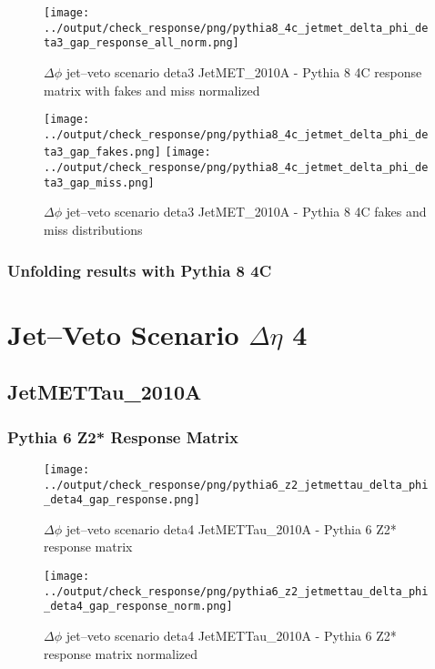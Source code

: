 \documentclass[11pt]{book}
\begin{document}
\begin{figure}[ht]
\centering
\texttt{[image: ../output/check\_response/png/pythia8\_4c\_jetmet\_delta\_phi\_deta3\_gap\_response\_all\_norm.png]}
\caption{$\Delta\phi$ jet--veto scenario deta3 JetMET\_2010A - Pythia 8 4C response matrix with fakes and miss normalized}
\label{p8_jetmet_delta_phi_deta3_gap_response_all_norm}
\end{figure}

\begin{figure}[ht]
\centering
\texttt{[image: ../output/check\_response/png/pythia8\_4c\_jetmet\_delta\_phi\_deta3\_gap\_fakes.png]}
\texttt{[image: ../output/check\_response/png/pythia8\_4c\_jetmet\_delta\_phi\_deta3\_gap\_miss.png]}
\caption{$\Delta\phi$ jet--veto scenario deta3 JetMET\_2010A - Pythia 8 4C fakes and miss distributions}
\label{p8_jetmet_delta_phi_deta3_gap_fakesmiss}
\end{figure}


\clearpage
\subsection{Unfolding results with Pythia 8 4C}


\newpage
\chapter{Jet--Veto Scenario $\Delta\eta$ 4}
\section{JetMETTau\_2010A}
\subsection{Pythia 6 Z2* Response Matrix}

\begin{figure}[ht]
\centering
\texttt{[image: ../output/check\_response/png/pythia6\_z2\_jetmettau\_delta\_phi\_deta4\_gap\_response.png]}
\caption{$\Delta\phi$ jet--veto scenario deta4 JetMETTau\_2010A - Pythia 6 Z2* response matrix}
\label{p6_jetmettau_delta_phi_deta4_gap_response}
\end{figure}

\begin{figure}[ht]
\centering
\texttt{[image: ../output/check\_response/png/pythia6\_z2\_jetmettau\_delta\_phi\_deta4\_gap\_response\_norm.png]}
\caption{$\Delta\phi$ jet--veto scenario deta4 JetMETTau\_2010A - Pythia 6 Z2* response matrix normalized}
\label{p6_jetmettau_delta_phi_deta4_gap_response_norm}
\end{figure}
\end{document}
